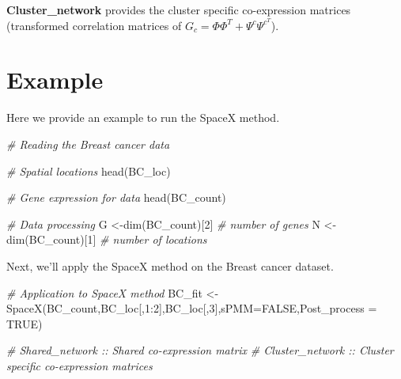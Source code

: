 \documentclass[
]{book}
\newenvironment{Shaded}{\begin{snugshade}}{\end{snugshade}}
\newcommand{\AttributeTok}[1]{\textcolor[rgb]{0.77,0.63,0.00}{#1}}
\newcommand{\CommentTok}[1]{\textcolor[rgb]{0.56,0.35,0.01}{\textit{#1}}}
\newcommand{\ConstantTok}[1]{\textcolor[rgb]{0.00,0.00,0.00}{#1}}
\newcommand{\DecValTok}[1]{\textcolor[rgb]{0.00,0.00,0.81}{#1}}
\newcommand{\FunctionTok}[1]{\textcolor[rgb]{0.00,0.00,0.00}{#1}}
\newcommand{\NormalTok}[1]{#1}
\newcommand{\OtherTok}[1]{\textcolor[rgb]{0.56,0.35,0.01}{#1}}
\newcommand{\SpecialCharTok}[1]{\textcolor[rgb]{0.00,0.00,0.00}{#1}}
\begin{document}
\textbf{Cluster\_network} provides the cluster specific co-expression matrices (transformed correlation matrices of \(G_{c} = \Phi \Phi^{T} + \Psi^{c} {\Psi^{c^{T}}}\)).

\hypertarget{example}{%
\section{Example}\label{example}}

Here we provide an example to run the SpaceX method.

\begin{Shaded}
\begin{Highlighting}[]
\CommentTok{\# Reading the Breast cancer data}

\CommentTok{\# Spatial locations}
\FunctionTok{head}\NormalTok{(BC\_loc)}

\CommentTok{\# Gene expression for data}
\FunctionTok{head}\NormalTok{(BC\_count) }

\CommentTok{\# Data processing}
\NormalTok{G }\OtherTok{\textless{}{-}}\FunctionTok{dim}\NormalTok{(BC\_count)[}\DecValTok{2}\NormalTok{] }\CommentTok{\# number of genes}
\NormalTok{N }\OtherTok{\textless{}{-}}\FunctionTok{dim}\NormalTok{(BC\_count)[}\DecValTok{1}\NormalTok{] }\CommentTok{\# number of locations}
\end{Highlighting}
\end{Shaded}

Next, we'll apply the SpaceX method on the Breast cancer dataset.

\begin{Shaded}
\begin{Highlighting}[]
\CommentTok{\# Application to SpaceX method}
\NormalTok{BC\_fit }\OtherTok{\textless{}{-}} \FunctionTok{SpaceX}\NormalTok{(BC\_count,BC\_loc[,}\DecValTok{1}\SpecialCharTok{:}\DecValTok{2}\NormalTok{],BC\_loc[,}\DecValTok{3}\NormalTok{],}\AttributeTok{sPMM=}\ConstantTok{FALSE}\NormalTok{,}\AttributeTok{Post\_process =} \ConstantTok{TRUE}\NormalTok{)}

\CommentTok{\# Shared\_network :: Shared co{-}expression matrix}
\CommentTok{\# Cluster\_network :: Cluster specific co{-}expression matrices}
\end{Highlighting}
\end{Shaded}


  
\end{document}

